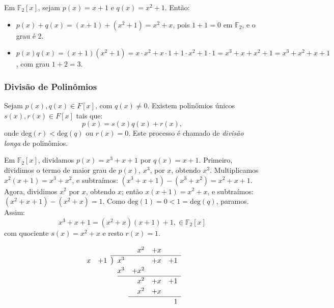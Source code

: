 \begin{example}
Em $\mathbb{F}_2[x]$, sejam $p(x) = x + 1$ e $q(x) = x^2 + 1$. Então:
\begin{itemize}
    \item $p(x) + q(x) = (x + 1) + (x^2 + 1) = x^2 + x$, pois $1 + 1 = 0$ em $\mathbb{F}_2$, e o grau é 2.
    \item $p(x) q(x) = (x + 1)(x^2 + 1) = x \cdot x^2 + x \cdot 1 + 1 \cdot x^2 + 1 \cdot 1 = x^3 + x + x^2 + 1 = x^3 + x^2 + x + 1$, com grau $1 + 2 = 3$.
\end{itemize}
\end{example}






\subsubsection*{Divisão de Polinômios}

\begin{theorem}
Sejam $p(x), q(x) \in F[x]$, com $q(x) \neq 0$. Existem polinômios únicos $s(x), r(x) \in F[x]$ tais que:
\[
p(x) = s(x) q(x) + r(x),
\]
onde $\text{deg}(r) < \text{deg}(q)$ ou $r(x) = 0$. Este processo é chamado de \emph{divisão longa} de polinômios.
\end{theorem}

\begin{example}\label{ex:polydivA}
  Em $\mathbb{F}_2[x]$, dividamos $p(x) = x^3 + x + 1$ por $q(x) = x + 1$.
  Primeiro, dividimos o termo de maior grau de $p(x)$, $x^3$, por $x$, obtendo
  $x^2$. Multiplicamos $x^2 (x + 1) = x^3 + x^2$, e subtraímos: 
  $(x^3 + x + 1) - (x^3 + x^2) = x^2 + x + 1$. Agora, dividimos $x^2$ por $x$, obtendo $x$;
  então $x (x + 1) = x^2 + x$, e subtraímos: $(x^2 + x + 1) - (x^2 + x) = 1$.
  Como $\text{deg}(1) = 0 < 1 = \text{deg}(q)$, paramos. Assim:
\[
x^3 + x + 1 = (x^2 + x) (x + 1) + 1, \in \mathbb{F}_2[x]
\]
com quociente $s(x) = x^2 + x$ e resto $r(x) = 1$.

\[
\renewcommand\arraystretch{1.2}
\begin{array}{*2r @{\hskip\arraycolsep}c@{\hskip\arraycolsep} *4r}
  &    &&    &  x^2 &  +x &  \\
\cline{3-7}
x & +1 &\big)& x^3 &   & +x & +1 \\
  &    &&  x^3 & +x^2 \\
\cline{4-7}
  &    &&    &  x^2 & +x & + 1\\
  &    &&    &  x^2 & +x \\
\cline{5-7}
  &    &&    &    &    & 1 \\
\end{array}
\]
\end{example}







